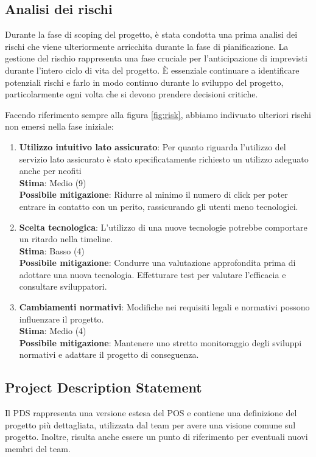 \documentclass[a4paper,12pt, openright]{report}
\begin{document}
\subsection{Analisi dei rischi}
Durante la fase di scoping del progetto, è stata condotta una prima analisi dei rischi che viene ulteriormente arricchita durante la fase di pianificazione. La gestione del rischio rappresenta una fase cruciale per l'anticipazione di imprevisti durante l'intero ciclo di vita del progetto. È essenziale continuare a identificare potenziali rischi e farlo in modo continuo durante lo sviluppo del progetto, particolarmente ogni volta che si devono prendere decisioni critiche.

Facendo riferimento sempre alla figura \ref{fig:risk}, abbiamo indivuato ulteriori rischi non emersi nella fase iniziale:
\begin{enumerate}
    \item \textbf{Utilizzo intuitivo lato assicurato}: Per quanto riguarda l'utilizzo del servizio lato assicurato è stato specificatamente richiesto un utilizzo adeguato anche per neofiti
    \\
    \textbf{Stima}: Medio (9)
    \\
    \textbf{Possibile mitigazione}: Ridurre al minimo il numero di click per poter entrare in contatto con un perito, rassicurando gli utenti meno tecnologici.
    \item \textbf{Scelta tecnologica}: L'utilizzo di una nuove tecnologie potrebbe comportare un ritardo nella timeline.
    \\
    \textbf{Stima}: Basso (4)
    \\
    \textbf{Possibile mitigazione}: Condurre una valutazione approfondita prima di adottare una nuova tecnologia. Effetturare test per valutare l'efficacia e consultare sviluppatori.
    \item \textbf{Cambiamenti normativi}: Modifiche nei requisiti legali e normativi possono influenzare il progetto.
    \\
    \textbf{Stima}: Medio (4)
    \\
    \textbf{Possibile mitigazione}: Mantenere uno stretto monitoraggio degli sviluppi normativi e adattare il progetto di conseguenza.
\end{enumerate}

\subsection{Project Description Statement}
Il PDS rappresenta una versione estesa del POS e contiene una definizione del progetto più dettagliata, utilizzata dal team per avere una visione comune sul progetto. Inoltre, risulta anche essere un punto di riferimento per eventuali nuovi membri del team.
\end{document}
